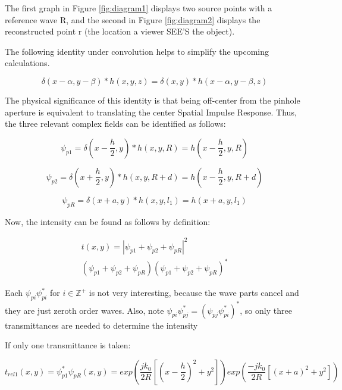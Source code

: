 \documentclass[12pt]{article}
\begin{document}
The first graph in Figure \ref{fig:diagram1} displays two source points with a reference wave R, and the second in Figure \ref{fig:diagram2} displays the reconstructed point r (the location a viewer SEE'S the object).

The following identity under convolution helps to simplify the upcoming calculations.

\begin{equation}
	\delta(x - \alpha,y - \beta)*h(x,y,z) = \delta(x,y)*h(x - \alpha,y - \beta,z)
\end{equation}

The physical significance of this identity is that being off-center from the pinhole aperture is equivalent to translating the center Spatial Impulse Response. Thus, the three relevant complex fields can be identified as follows:

\begin{equation}
	\psi_{p1} = \delta(x - \frac{h}{2},y)*h(x,y,R) = h(x - \frac{h}{2},y,R)
\end{equation}

\begin{equation}
	\psi_{p2} = \delta(x + \frac{h}{2},y)*h(x,y,R + d) =
	h(x - \frac{h}{2},y,R + d)
\end{equation}

\begin{equation}
	\psi_{pR} = \delta(x + a,y)*h(x,y,l_{1}) = h(x + a,y,l_{1})
\end{equation}

Now, the intensity can be found as follows by definition:

\begin{equation}
	\begin{multlined}
	t(x,y) = |\psi_{p1} + \psi_{p2} + \psi_{pR}|^2
	\\ (\psi_{p1} + \psi_{p2} + \psi_{pR})(\psi_{p1} + \psi_{p2} + \psi_{pR})^*
	\end{multlined}
\end{equation}

Each \(\psi_{pi}\psi_{pi}^*\) for \(i \in \mathbb{Z}^+\) is not very interesting, because the wave parts cancel and they are just zeroth order waves.
Also, note \(\psi_{pi}\psi_{pj}^* = (\psi_{pj}\psi_{pi}^*)^* \), so only three transmittances are needed to determine the intensity

If only one transmittance is taken:

\begin{equation}
	t_{rel1}(x,y) = \psi_{p1}^*\psi_{pR}(x,y) = exp(\frac{jk_{0}}{2R}[(x - \frac{h}{2})^2 + y^2])exp(\frac{-jk_{0}}{2R}[(x + a)^2 + y^2])
\end{equation}
\end{document}
